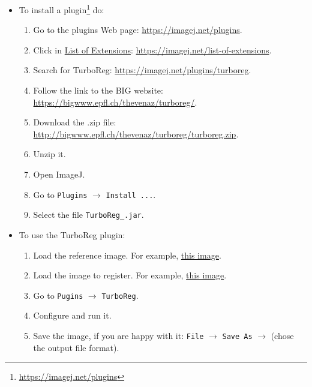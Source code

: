 \begin{itemize}
\item To install a plugin\footnote{\url{https://imagej.net/plugins}} do:
  \begin{enumerate}
  \item Go to the plugins Web page: \url{https://imagej.net/plugins}.
  \item Click in \href{https://imagej.net/list-of-extensions}{List of Extensions}: \url{https://imagej.net/list-of-extensions}.
  \item Search for TurboReg: \url{https://imagej.net/plugins/turboreg}.
  \item Follow the link to the BIG website: \url{https://bigwww.epfl.ch/thevenaz/turboreg/}.
  \item Download the .zip file: \url{http://bigwww.epfl.ch/thevenaz/turboreg/turboreg.zip}.
  \item Unzip it.
  \item Open ImageJ.
  \item Go to \texttt{Plugins} $\rightarrow$ \texttt{Install ...}.
  \item Select the file \texttt{TurboReg\_.jar}.
  \end{enumerate}
  \newpage
\item To use the TurboReg plugin:
  \begin{enumerate}
  \item Load the reference image. For example, \href{https://d2rfm59k9u0hrr.cloudfront.net/medpix/img/full/synpic50411.jpg}{this image}.
  \item Load the image to register. For example, \href{https://d2rfm59k9u0hrr.cloudfront.net/medpix/img/full/synpic50412.jpg}{this image}.
  \item Go to \texttt{Pugins} $\rightarrow$ \texttt{TurboReg}.
  \item Configure and run it.
  \item Save the image, if you are happy with it: \texttt{File}
    $\rightarrow$ \texttt{Save As} $\rightarrow$ (chose the output file
    format).
  \end{enumerate}
\end{itemize}

